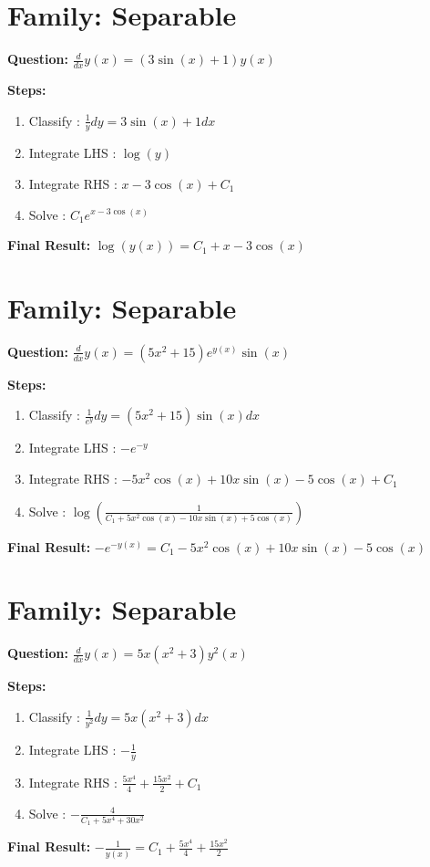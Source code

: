 \documentclass{article}
\begin{document}
\section*{Family: Separable}
\textbf{Question:} $\frac{d}{d x} y{\left(x \right)} = \left(3 \sin{\left(x \right)} + 1\right) y{\left(x \right)}$

\textbf{Steps:}
\begin{enumerate}
\item Classify :  $\frac{1}{y} dy = 3 \sin{\left(x \right)} + 1 dx$
\item Integrate LHS :  $\log{\left(y \right)}$
\item Integrate RHS :  $x - 3 \cos{\left(x \right)} + C_1$
\item Solve :  $C_{1} e^{x - 3 \cos{\left(x \right)}}$
\end{enumerate}
\textbf{Final Result:} $\log{\left(y{\left(x \right)} \right)} = C_{1} + x - 3 \cos{\left(x \right)}$

\section*{Family: Separable}
\textbf{Question:} $\frac{d}{d x} y{\left(x \right)} = \left(5 x^{2} + 15\right) e^{y{\left(x \right)}} \sin{\left(x \right)}$

\textbf{Steps:}
\begin{enumerate}
\item Classify :  $\frac{1}{e^{y}} dy = \left(5 x^{2} + 15\right) \sin{\left(x \right)} dx$
\item Integrate LHS :  $- e^{- y}$
\item Integrate RHS :  $- 5 x^{2} \cos{\left(x \right)} + 10 x \sin{\left(x \right)} - 5 \cos{\left(x \right)} + C_1$
\item Solve :  $\log{\left(\frac{1}{C_{1} + 5 x^{2} \cos{\left(x \right)} - 10 x \sin{\left(x \right)} + 5 \cos{\left(x \right)}} \right)}$
\end{enumerate}
\textbf{Final Result:} $- e^{- y{\left(x \right)}} = C_{1} - 5 x^{2} \cos{\left(x \right)} + 10 x \sin{\left(x \right)} - 5 \cos{\left(x \right)}$

\section*{Family: Separable}
\textbf{Question:} $\frac{d}{d x} y{\left(x \right)} = 5 x \left(x^{2} + 3\right) y^{2}{\left(x \right)}$

\textbf{Steps:}
\begin{enumerate}
\item Classify :  $\frac{1}{y^{2}} dy = 5 x \left(x^{2} + 3\right) dx$
\item Integrate LHS :  $- \frac{1}{y}$
\item Integrate RHS :  $\frac{5 x^{4}}{4} + \frac{15 x^{2}}{2} + C_1$
\item Solve :  $- \frac{4}{C_{1} + 5 x^{4} + 30 x^{2}}$
\end{enumerate}
\textbf{Final Result:} $- \frac{1}{y{\left(x \right)}} = C_{1} + \frac{5 x^{4}}{4} + \frac{15 x^{2}}{2}$
\end{document}
